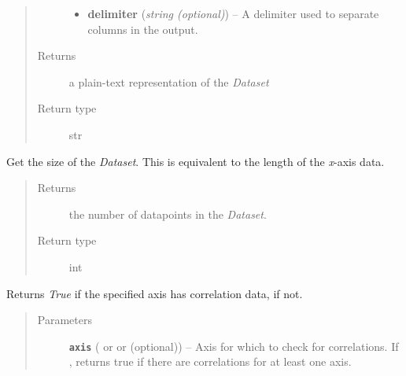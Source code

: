 \documentclass[a4paper,10pt,english]{sphinxmanual}
\begin{document}
\begin{fulllineitems}
\begin{fulllineitems}
\begin{quote}
\begin{description}
\begin{itemize}
\item {} 
\textbf{delimiter} (\emph{string (optional)}) --
A delimiter used to separate columns in the output.

\end{itemize}

\item[{Returns}] \leavevmode
a plain-text representation of the \emph{Dataset}

\item[{Return type}] \leavevmode
str

\end{description}\end{quote}

\end{fulllineitems}


\begin{fulllineitems}
\label{index:kafe.dataset.Dataset.get_size}
Get the size of the \emph{Dataset}. This is equivalent to the length of the
\emph{x}-axis data.
\begin{quote}\begin{description}
\item[{Returns}] \leavevmode
the number of datapoints in the \emph{Dataset}.

\item[{Return type}] \leavevmode
int

\end{description}\end{quote}

\end{fulllineitems}


\begin{fulllineitems}
\label{index:kafe.dataset.Dataset.has_correlations}
Returns \emph{True} if the specified axis has correlation data,  if
not.
\begin{quote}\begin{description}
\item[{Parameters}] \leavevmode
\textbf{\texttt{axis}} ( or  or  (optional)) -- Axis for which to check for correlations. If ,
returns true if there are correlations for at least one axis.


\end{description}
\end{quote}
\end{fulllineitems}
\end{fulllineitems}
\end{document}
